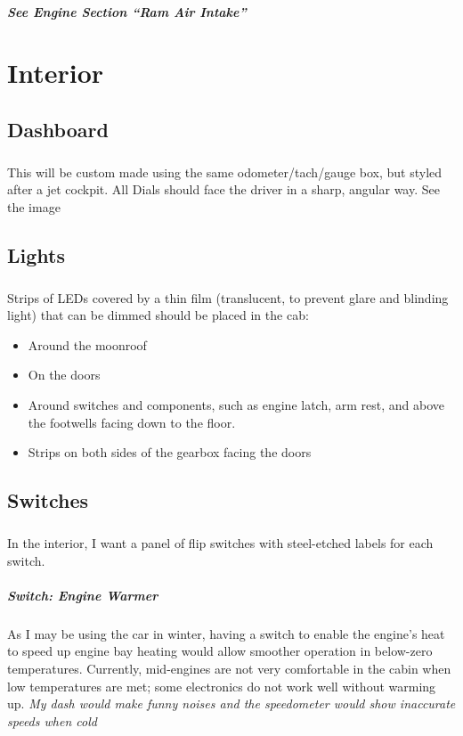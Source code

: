 \documentclass[a4paper,10pt]{report}
\begin{document}
\paragraph*{See Engine Section ``Ram Air Intake'' }



\chapter{Interior}
\section{Dashboard}
\paragraph*{} This will be custom made using the same odometer/tach/gauge box, but styled after a jet cockpit. All Dials should face the driver in a sharp, angular way. See the image %
\section{Lights}
\paragraph*{}Strips of LEDs covered by a thin film (translucent, to prevent glare and blinding light) that can be dimmed should be placed in the cab: 
\begin{itemize}
 \item Around the moonroof
 \item On the doors
 \item Around switches and components, such as engine latch, arm rest, and above the footwells facing down to the floor.
 \item Strips on both sides of the gearbox facing the doors
\end{itemize}
\section{Switches}
\paragraph*{}In the interior, I want a panel of flip switches with steel-etched labels for each switch. 
\paragraph*{Switch: Engine Warmer}As I may be using the car in winter, having a switch to enable the engine's heat to speed up engine bay heating would allow smoother operation in below-zero temperatures. Currently, mid-engines are not very comfortable in the cabin when low temperatures are met; some electronics do not work well without warming up. \textit{My dash would make funny noises and the speedometer would show inaccurate speeds when cold}
\end{document}
